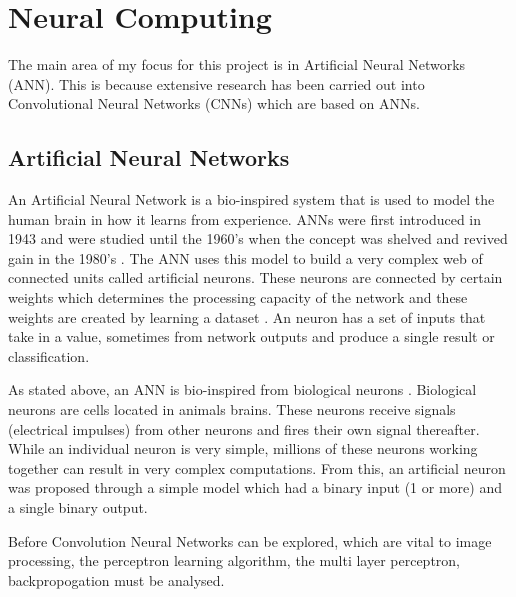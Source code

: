 \section{Neural Computing}
The main area of my focus for this project is in
Artificial Neural Networks (ANN). This is because extensive research has been carried out into Convolutional Neural Networks (CNNs) which are based on ANNs.
\subsection*{Artificial Neural Networks}
An Artificial Neural Network is a bio-inspired system that is used to model the human brain in how it learns from experience.
ANNs were first introduced in 1943 and were studied until the 1960's when the concept was shelved and revived gain in the 1980's \parencite{handsOnML}.
The ANN uses this model to build a very complex web of connected units called
artificial neurons.
These neurons are connected by certain weights which determines the processing
capacity of the network and these weights are created by learning a
dataset \parencite{malachy}.
An neuron has a set of inputs that take in a value, sometimes from network outputs
and produce a single result or classification.

As stated above, an ANN is bio-inspired from biological neurons \parencite{handsOnML}.
Biological neurons are cells located in animals brains.
These neurons receive signals (electrical impulses) from other neurons and fires their own signal thereafter.
While an individual neuron is very simple, millions of these neurons working together can result in very complex computations.
From this, an artificial neuron was proposed through a simple model which had a binary input (1 or more) and a single binary output.


Before Convolution Neural Networks can be explored, which are vital to image
processing, the perceptron learning algorithm, the multi
layer perceptron, backpropogation must be analysed.




